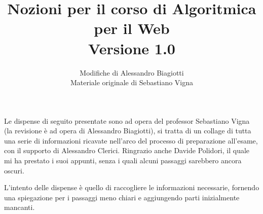 \documentclass{article}
\title{
    Nozioni per il corso di Algoritmica per il Web\\
    \large{Versione 1.0}
}
\author{\large{Modifiche di Alessandro Biagiotti}\\[1ex]
    \large{Materiale originale di Sebastiano Vigna}
  }
\date{}
\begin{document}
\maketitle
\clearpage
\tableofcontents
\clearpage
\noindent Le dispense di seguito presentate sono ad opera del professor Sebastiano Vigna (la
revisione è ad opera di Alessandro Biagiotti), si tratta di un collage di tutta una serie di
informazioni ricavate nell'arco del processo di preparazione all'esame, con il supporto di
Alessandro Clerici. Ringrazio anche Davide Polidori, il quale mi ha prestato i suoi appunti, senza i
quali alcuni passaggi sarebbero ancora oscuri.

L'intento delle dispense è quello di raccogliere le informazioni necessarie, fornendo una spiegazione per i passaggi meno chiari e aggiungendo parti inizialmente mancanti.













\end{document}
